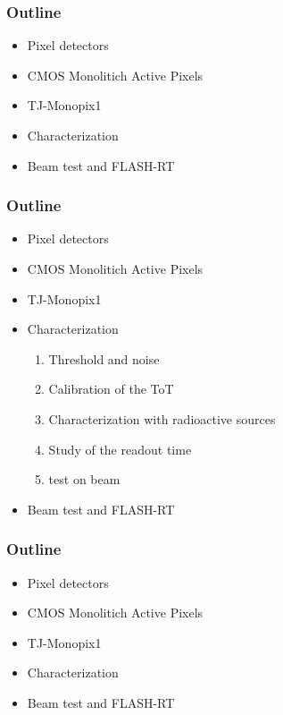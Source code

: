 \documentclass{beamer}
\begin{document}
\begin{frame}
    \frametitle{Outline}
    \begin{itemize}
        \item Pixel detectors 
        \item CMOS Monolitich Active Pixels 
        \item TJ-Monopix1
        \item Characterization 
        \item Beam test and FLASH-RT
    \end{itemize}
\end{frame}


\begin{frame}
    \frametitle{Outline}
    \begin{itemize}
        \item Pixel detectors 
        \item CMOS Monolitich Active Pixels 
        \item TJ-Monopix1
        \item Characterization 
        \begin{enumerate}
            \item Threshold and noise
            \item Calibration of the ToT
            \item Characterization with radioactive sources
            \item Study of the readout time \bigskip\bigskip
            \item test on beam
        \end{enumerate}
        \item Beam test and FLASH-RT
    \end{itemize}
\end{frame}


\begin{frame}
    \frametitle{Outline}
    \begin{itemize}
        \item Pixel detectors 
        \item CMOS Monolitich Active Pixels 
        \item TJ-Monopix1
        \item Characterization 
        \item Beam test and FLASH-RT
    \end{itemize}
\end{frame}






        
\end{document}
